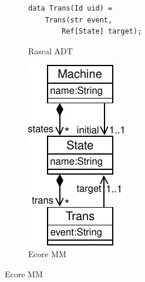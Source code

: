 \begin{figure}[bt]
\begin{subfigure}[b]{.3\columnwidth}
\begin{lstlisting}[label=lst:fsm-adt, language=Rascal, numbers=none, xleftmargin=0pt, tabsize=1]
data Trans(Id uid) =
	Trans(str event,
		Ref[State] target);
		\end{lstlisting}
		\caption{Rascal ADT}
	\end{subfigure}
	\vrule
	\enskip
	\begin{subfigure}[b]{.26\columnwidth}
		\includegraphics[width=\textwidth]{figures/fsm-mm}
		\caption{Ecore MM}
	\end{subfigure}

\end{figure}
